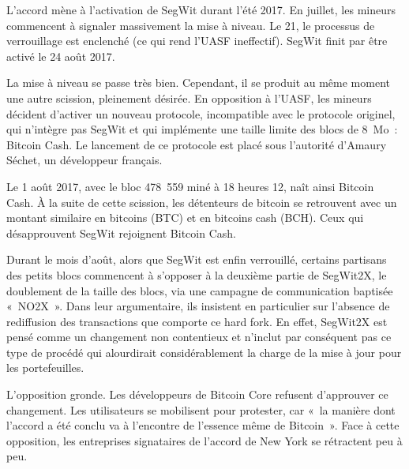 L'accord mène à l'activation de SegWit durant l'été 2017. En juillet, les mineurs commencent à signaler massivement la mise à niveau. Le 21, le processus de verrouillage est enclenché (ce qui rend l'UASF ineffectif). SegWit finit par être activé le 24 août 2017.

La mise à niveau se passe très bien. Cependant, il se produit au même moment une autre scission, pleinement désirée. En opposition à l'UASF, les mineurs décident d'activer un nouveau protocole, incompatible avec le protocole originel, qui n'intègre pas SegWit et qui implémente une taille limite des blocs de 8~Mo~: Bitcoin Cash. Le lancement de ce protocole est placé sous l'autorité d'Amaury Séchet, un développeur français.

Le 1\ier{} août 2017, avec le bloc 478~559 miné à 18 heures 12, naît ainsi Bitcoin Cash. À la suite de cette scission, les détenteurs de bitcoin se retrouvent avec un montant similaire en bitcoins (BTC) et en bitcoins cash (BCH). Ceux qui désapprouvent SegWit rejoignent Bitcoin Cash.

Durant le mois d'août, alors que SegWit est enfin verrouillé, certains partisans des petits blocs commencent à s'opposer à la deuxième partie de SegWit2X, le doublement de la taille des blocs, via une campagne de communication baptisée «~NO2X~». Dans leur argumentaire, ils insistent en particulier sur l'absence de rediffusion des transactions que comporte ce hard fork. En effet, SegWit2X est pensé comme un changement non contentieux et n'inclut par conséquent pas ce type de procédé qui alourdirait considérablement la charge de la mise à jour pour les portefeuilles.

L'opposition gronde. Les développeurs de Bitcoin Core refusent d'approuver ce changement. Les utilisateurs se mobilisent pour protester, car «~la manière dont l'accord a été conclu va à l'encontre de l'essence même de Bitcoin~». Face à cette opposition, les entreprises signataires de l'accord de New York se rétractent peu à peu.

